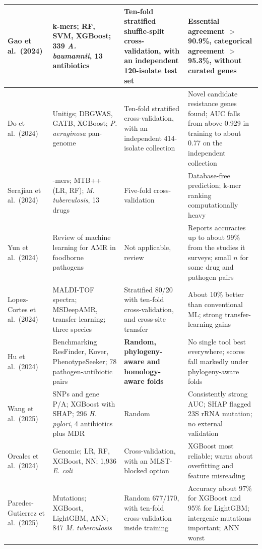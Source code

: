 {\begin{longtable}{|>{\raggedright\arraybackslash}p{2.7cm}|>{\raggedright\arraybackslash}p{3.9cm}|>{\raggedright\arraybackslash}p{2.2cm}|>{\raggedright\arraybackslash}p{4.7cm}|}
Gao et al.\ (2024) \cite{Gao2024} & k-mers; RF, SVM, XGBoost; 339 \textit{A. baumannii}, 13 antibiotics & Ten-fold stratified shuffle-split cross-\allowbreak validation, with an independent 120-isolate test set & Essential agreement $>$90.9\%, categorical agreement $>$95.3\%, without curated genes \\ \hline
Do et al.\ (2024) \cite{Do2024} & Unitigs; DBGWAS, GATB, XGBoost; \textit{P. aeruginosa} pan-genome & Ten-fold stratified cross-\allowbreak validation, with an independent 414-isolate collection & Novel candidate resistance genes found; AUC falls from above 0.929 in training to about 0.77 on the independent collection \\ \hline
Serajian et al.\ (2024) \cite{serajian2024mtbpp} & 31-mers; MTB++ (LR, RF); \textit{M. tuberculosis}, 13 drugs & Five-fold cross-validation & Database-free prediction; k-mer ranking computationally heavy \\ \hline
Yun et al.\ (2024) \cite{Yun2024} & Review of machine learning for AMR in foodborne pathogens & Not applicable, review & Reports accuracies up to about 99\% from the studies it surveys; small $n$ for some drug and pathogen pairs \\ \hline
Lopez-Cortes et al.\ (2024) \cite{LopezCortes2024} & MALDI-TOF spectra; MSDeepAMR, transfer learning; three species & Stratified 80/20 with ten-fold cross-\allowbreak validation, and cross-site transfer & About 10\% better than conventional ML; strong transfer-learning gains \\ \hline
Hu et al.\ (2024) \cite{Hu2024} & Benchmarking ResFinder, Kover, PhenotypeSeeker; 78 pathogen-antibiotic pairs & \textbf{Random, phylo\-geny-\allowbreak aware and homo\-logy-\allowbreak aware folds} & No single tool best everywhere; scores fall markedly under phylogeny-aware folds \\ \hline
Wang et al.\ (2025) \cite{Wang2025} & SNPs and gene P/A; XGBoost with SHAP; 296 \textit{H. pylori}, 4 antibiotics plus MDR & Random & Consistently strong AUC; SHAP flagged 23S rRNA mutation; no external validation \\ \hline
Orcales et al.\ (2024) \cite{Orcales2024} & Genomic; LR, RF, XGBoost, NN; 1,936 \textit{E. coli} & Cross-validation, with an MLST-blocked option & XGBoost most reliable; warns about overfitting and feature misreading \\ \hline
Paredes-Gutierrez et al.\ (2025) \cite{ParedesGutierrez2025} & Mutations; XGBoost, LightGBM, ANN; 847 \textit{M. tuberculosis} & Random 677/170, with ten-fold cross-\allowbreak validation inside training & Accuracy about 97\% for XGBoost and 95\% for LightGBM; intergenic mutations important; ANN worst \\ \hline

\end{longtable}}
